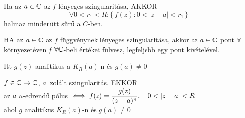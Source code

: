 \begin{enumerate}
    \begin{te}
      Ha az $a\in\mathbb{C}$ az $f$ lényeges szingularitása, AKKOR\
      \[ \forall 0< r_1 < R\colon \{\, f(z) :  0 < |z-a| < r_1\,\} \]
      halmaz mindenütt sűrű a $C$-ben.      
    \end{te}
    \begin{te}[Picard]
      HA az $a\in\mathbb{C}$ az $f$ függvénynek lényeges szingularitása, akkor az $a\in\mathbb{C}$ pont $\forall$ környezetéven $f$
      $\forall \mathbb{C}$-beli értéket fülvesz, legfeljebb egy pont kivételével.     
    \end{te}

    Itt $g(z)$ analitikus a $K_R(a)$-n és $g(a) \neq 0$
    \begin{te}
      $f\in\mathbb{C}\to\mathbb{C}$, $a$ izolált szingularitás. EKKOR\\
      az $a$ $n$-edrendű pólus $\iff\di f(z) = \dfrac{g(z)}{(z-a)^n},\quad 0<|z-a|<R$ \\
      ahol $g$ analitikus $K_R(a)$-n és $g(a) \neq 0$
    \end{te}

\end{enumerate}


